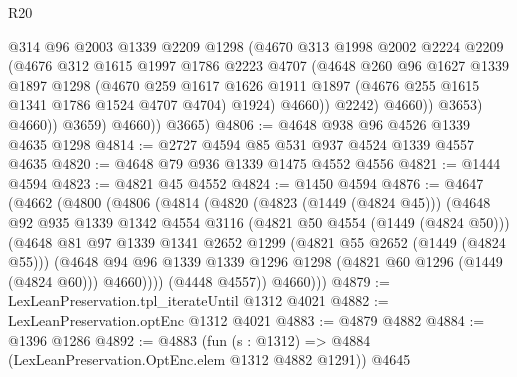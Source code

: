 \begin{lexlean}{R20}
\begin{coremodule}
                      @314
                      @96
                      @2003
                      @1339
                      @2209
                      @1298
                      (@4670
                        @313
                        @1998
                        @2002
                        @2224
                        @2209
                        (@4676
                          @312
                          @1615
                          @1997
                          @1786
                          @2223
                          @4707
                          (@4648
                            @260
                            @96
                            @1627
                            @1339
                            @1897
                            @1298
                            (@4670
                              @259
                              @1617
                              @1626
                              @1911
                              @1897
                              (@4676 @255 @1615 @1341 @1786 @1524 @4707 @4704)
                              @1924)
                            @4660))
                        @2242)
                      @4660))
                  @3653)
                @4660))
            @3659)
          @4660))
      @3665)
@4806 := @4648 @938 @96 @4526 @1339 @4635 @1298
@4814 := @2727 @4594 @85 @531 @937 @4524 @1339 @4557 @4635
@4820 := @4648 @79 @936 @1339 @1475 @4552 @4556
@4821 := @1444 @4594
@4823 := @4821 @45 @4552
@4824 := @1450 @4594
@4876 := @4647
    (@4662
      (@4800
        (@4806
          (@4814
            (@4820
              (@4823 (@1449 (@4824 @45)))
              (@4648
                @92
                @935
                @1339
                @1342
                @4554
                @3116
                (@4821 @50 @4554 (@1449 (@4824 @50)))
                (@4648
                  @81
                  @97
                  @1339
                  @1341
                  @2652
                  @1299
                  (@4821 @55 @2652 (@1449 (@4824 @55)))
                  (@4648
                    @94
                    @96
                    @1339
                    @1339
                    @1296
                    @1298
                    (@4821 @60 @1296 (@1449 (@4824 @60)))
                    @4660))))
            (@4448 @4557))
          @4660)))
@4879 := LexLeanPreservation.tpl_iterateUntil @1312 @4021
@4882 := LexLeanPreservation.optEnc @1312 @4021
@4883 := @4879 @4882
@4884 := @1396 @1286
@4892 := @4883 (fun (s : @1312) => @4884 (LexLeanPreservation.OptEnc.elem @1312 @4882 @1291)) @4645

\end{coremodule}
\end{lexlean}
